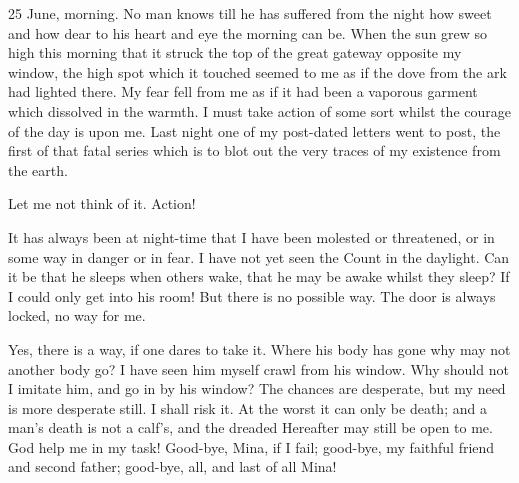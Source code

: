 \begin{diary}{25 June, morning.}
No man knows till he has suffered from the night how sweet and how dear to his heart and eye the morning can be. When the sun grew so high this morning that it struck the top of the great gateway opposite my window, the high spot which it touched seemed to me as if the dove from the ark had lighted there. My fear fell from me as if it had been a vaporous garment which dissolved in the warmth. I must take action of some sort whilst the courage of the day is upon me. Last night one of my post-dated letters went to post, the first of that fatal series which is to blot out the very traces of my existence from the earth.

Let me not think of it. Action!

It has always been at night-time that I have been molested or threatened, or in some way in danger or in fear. I have not yet seen the Count in the daylight. Can it be that he sleeps when others wake, that he may be awake whilst they sleep? If I could only get into his room! But there is no possible way. The door is always locked, no way for me.

Yes, there is a way, if one dares to take it. Where his body has gone why may not another body go? I have seen him myself crawl from his window. Why should not I imitate him, and go in by his window? The chances are desperate, but my need is more desperate still. I shall risk it. At the worst it can only be death; and a man's death is not a calf's, and the dreaded Hereafter may still be open to me. God help me in my task! Good-bye, Mina, if I fail; good-bye, my faithful friend and second father; good-bye, all, and last of all Mina!
\end{diary}
 
